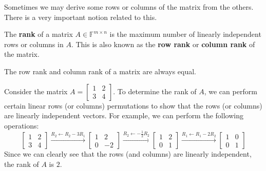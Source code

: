 \documentclass[../lecture-notes.tex]{subfiles}
\begin{document}
Sometimes we may derive some rows or columns of the matrix from the others. There is a very important notion related to this.

\begin{definition}
    The \textbf{rank} of a matrix $A \in \mathbb{F}^{m \times n}$ is the maximum number of linearly independent rows or columns in $A$. This is also known as the \textbf{row rank} or \textbf{column rank} of the matrix.
\end{definition}

\begin{remark}
    The row rank and column rank of a matrix are always equal.
\end{remark}

\begin{example}
    Consider the matrix $A = \begin{bmatrix} 1 & 2 \\ 3 & 4 \end{bmatrix}$. To
    determine the rank of $A$, we can perform certain linear rows (or columns)
    permutations to show that the rows (or columns) are linearly independent
    vectors. For example, we can perform the following operations:
    \begin{equation*}
        \begin{bmatrix} 
            1 & 2 \\ 
            3 & 4 
        \end{bmatrix} 
        \xrightarrow{R_2 \gets R_2 - 3R_1} 
        \begin{bmatrix} 
            1 & 2 \\ 
            0 & -2 
        \end{bmatrix} 
        \xrightarrow{R_2 \gets - \frac{1}{2}R_2} 
        \begin{bmatrix} 
            1 & 2 \\ 
            0 & 1 
        \end{bmatrix} 
        \xrightarrow{R_1 \gets R_1 - 2R_2} 
        \begin{bmatrix}
            1 & 0 \\
            0 & 1 
        \end{bmatrix}
    \end{equation*}
    Since we can clearly see that the rows (and columns) are linearly independent, the rank of $A$ is $2$.
\end{example}
\end{document}
